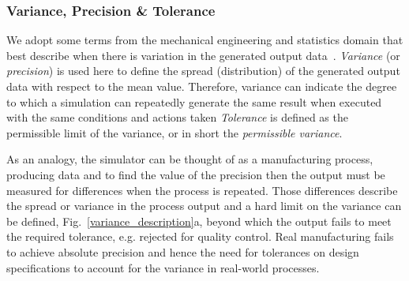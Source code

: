 \documentclass[letterpaper, 10 pt, journal, twoside]{IEEEtran}
\begin{document}
\subsubsection{Variance, Precision \& Tolerance}

We adopt some terms from the mechanical engineering and statistics domain that best describe when there is variation in the generated output data~\cite{ADictionaryofMechanicalEngineering}.
%
%
\textit{Variance} (or \textit{precision}) is used here to define the spread (distribution) of the generated output data with respect to the mean value. 
%
Therefore, variance can indicate the degree to which a simulation can repeatedly generate the same result when executed with the same conditions and actions taken
%
\textit{Tolerance} is defined as the permissible limit of the variance, or in short the \textit{permissible variance}. 

%
As an analogy, the simulator can be thought of as a manufacturing process, producing data and to find the value of the precision then the output must be measured for differences when the process is repeated. Those differences describe the spread or variance in the process output and a hard limit on the variance can be defined, Fig.~\ref{variance_description}a, beyond which the output fails to meet the required tolerance, e.g. rejected for quality control.
%
%
Real manufacturing fails to achieve absolute precision and hence the need for tolerances on design specifications to account for the variance in real-world processes. 
\end{document}
